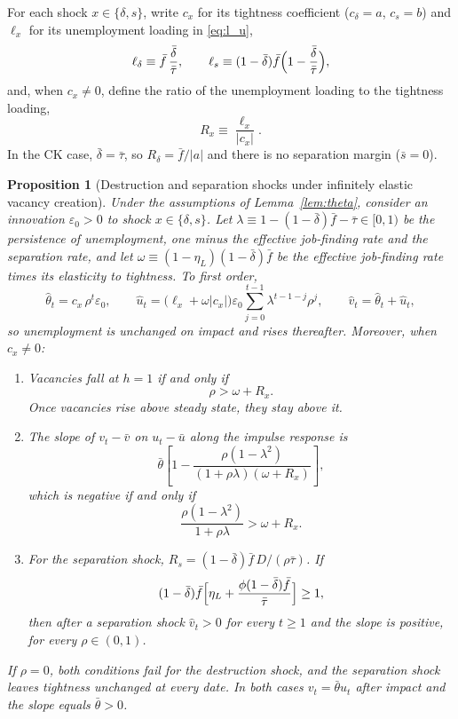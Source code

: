 \documentclass[authoryear, review, 12pt]{elsarticle}
\newtheorem{proposition}{Proposition}
\begin{document}
For each shock $x\in\{\delta,s\}$, write $c_x$ for its tightness coefficient
($c_\delta=a$, $c_s=b$) and $\ell_x$ for its unemployment loading in \eqref{eq:l_u},
\[
	\ell_\delta\equiv\bar f\,\frac{\bar\delta}{\bar\tau},
	\qquad
	\ell_s\equiv(1-\bar\delta)\bar f\Bigl(1-\frac{\bar\delta}{\bar\tau}\Bigr),
\]
and, when $c_x\ne0$, define the ratio of the unemployment loading to the tightness loading,
\[
	R_x\equiv\frac{\ell_x}{\lvert c_x\rvert}.
\]
In the CK case, $\bar\delta=\bar\tau$, so $R_\delta=\bar f/\lvert a\rvert$ and there is no
separation margin ($\bar s=0$).

\begin{proposition}[Destruction and separation shocks under infinitely elastic vacancy creation]
\label{prop:fe}
Under the assumptions of Lemma~\ref{lem:theta}, consider an innovation $\varepsilon_0>0$ to
shock $x\in\{\delta,s\}$. Let $\lambda\equiv1-(1-\bar\delta)\bar f-\bar\tau\in[0,1)$ be the
persistence of unemployment, one minus the effective job-finding rate and the separation
rate, and let $\omega\equiv(1-\eta_L)(1-\bar\delta)\bar f$ be the effective job-finding rate
times its elasticity to tightness. To first order,
\[
	\hat\theta_t=c_x\,\rho^t\varepsilon_0,
	\qquad
	\hat u_t=\bigl(\ell_x+\omega\lvert c_x\rvert\bigr)\varepsilon_0\sum_{j=0}^{t-1}\lambda^{t-1-j}\rho^j,
	\qquad
	\hat v_t=\hat\theta_t+\hat u_t ,
\]
so unemployment is unchanged on impact and rises thereafter. Moreover, when $c_x\ne0$:
\begin{enumerate}
	\item Vacancies fall at $h=1$ if and only if
	\begin{equation}\label{eq:H1}
		\rho>\omega+R_x .
	\end{equation}
	Once vacancies rise above steady state, they stay above it.
	\item The slope of $v_t-\bar v$ on $u_t-\bar u$ along the impulse response is
	\begin{equation}\label{eq:slope}
		\bar\theta\left[1-\frac{\rho(1-\lambda^2)}{(1+\rho\lambda)(\omega+R_x)}\right],
	\end{equation}
	which is negative if and only if
	\begin{equation}\label{eq:HP}
		\frac{\rho(1-\lambda^2)}{1+\rho\lambda}>\omega+R_x .
	\end{equation}
	\item For the separation shock, $R_s=(1-\bar\delta)\bar f\,D/(\rho\bar\tau)$. If
	\begin{equation}\label{eq:s_bound}
		(1-\bar\delta)\bar f\Bigl[\eta_L+\frac{\phi(1-\bar\delta)\bar f}{\bar\tau}\Bigr]\ge1,
	\end{equation}
	then after a separation shock $\hat v_t>0$ for every $t\ge1$ and the slope is positive,
	for every $\rho\in(0,1)$.
\end{enumerate}
If $\rho=0$, both conditions fail for the destruction shock, and the separation shock leaves
tightness unchanged at every date. In both cases $v_t=\bar\theta u_t$ after impact and the
slope equals $\bar\theta>0$.
\end{proposition}
\end{document}
